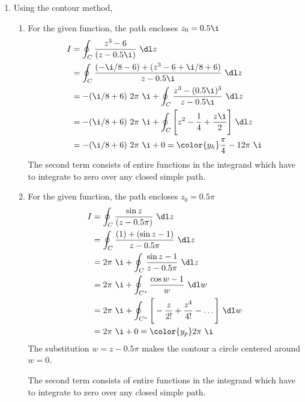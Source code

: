 \begin{enumerate}
    \item Using the contour method,
          \begin{enumerate}
              \item For the given function, the path encloses $ z_0 = 0.5\i $
                    \begin{align}
                        I & = \oint_C \frac{z^3 - 6}{(z - 0.5\i)}\ \dl z               \\
                          & = \oint_C \frac{(-\i/8 - 6)
                        + (z^3 - 6 + \i/8 + 6)}{z - 0.5\i}\ \dl z                      \\
                          & = -(\i/8 + 6)\ 2\pi\ \i
                        + \oint_C \frac{z^3 - (0.5\i)^3}{z - 0.5\i}\ \dl z             \\
                          & = -(\i/8 + 6)\ 2\pi\ \i
                        + \oint_C \Bigg[z^2 - \frac{1}{4} + \frac{z\i}{2}\Bigg]\ \dl z \\
                          & = -(\i/8 + 6)\ 2\pi\ \i
                        + 0 = \color{y_h} \frac{\pi}{4} - 12\pi\ \i
                    \end{align}
                    The second term consists of entire functions in the integrand which
                    have to integrate to zero over any closed simple path.

              \item For the given function, the path encloses $ z_0 = 0.5\pi $
                    \begin{align}
                        I & = \oint_C \frac{\sin z}{(z - 0.5\pi)}\ \dl z \\
                          & = \oint_C \frac{(1)
                        + (\sin z - 1)}{z - 0.5\pi}\ \dl z               \\
                          & = 2\pi\ \i
                        + \oint_C \frac{\sin z - 1}{z - 0.5\pi}\ \dl z   \\
                          & = 2\pi\ \i
                        + \oint_{C^*} \frac{\cos w - 1}{w}\ \dl w        \\
                          & = 2\pi\ \i
                        + \oint_{C^*} \Bigg[ -\frac{z}{2!} + \frac{z^4}{4!}
                        - \dots \Bigg]\ \dl w                            \\
                          & = 2\pi\ \i
                        + 0 = \color{y_p} 2\pi\ \i
                    \end{align}
                    The substitution $ w = z - 0.5\pi $ makes the contour a circle
                    centered around $ w = 0 $. \par
                    The second term consists of entire functions in the integrand which
                    have to integrate to zero over any closed simple path.


\end{enumerate}
\end{enumerate}

